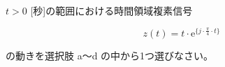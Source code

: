 $t > 0$ [秒]の範囲における時間領域複素信号 

\[
z(t) = t \cdot \textrm{e}^{\{ j \cdot \frac{\pi}{4} \cdot t \}}
\]

\medskip
\noindent の動きを選択肢 a〜d の中から1つ選びなさい。
